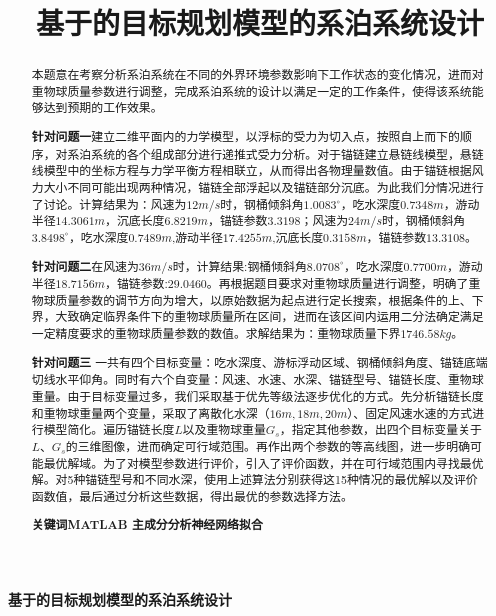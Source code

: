 \documentclass{cumcm}
\title{基于的目标规划模型的系泊系统设计}
\begin{document}
 

\begin{minipage}{0.9\textwidth}
\centering\LARGE\textbf{基于的目标规划模型的系泊系统设计}
\end{minipage}

\setcounter{page}{1}
\begin{abstract}
本题意在考察分析系泊系统在不同的外界环境参数影响下工作状态的变化情况，进而对重物球质量参数进行调整，完成系泊系统的设计以满足一定的工作条件，使得该系统能够达到预期的工作效果。\par
\textbf{针对问题一}\quad 建立二维平面内的力学模型，以浮标的受力为切入点，按照自上而下的顺序，对系泊系统的各个组成部分进行递推式受力分析。对于锚链建立悬链线模型，悬链线模型中的坐标方程与力学平衡方程相联立，从而得出各物理量数值。由于锚链根据风力大小不同可能出现两种情况，锚链全部浮起以及锚链部分沉底。为此我们分情况进行了讨论。计算结果为：风速为$12m/s$时，钢桶倾斜角$1.0083^\circ$，吃水深度$0.7348m$，游动半径$14.3061m$，沉底长度$6.8219m$，锚链参数$3.3198$；风速为$24m/s$时，钢桶倾斜角$3.8498^\circ$，吃水深度$0.7489m$,游动半径$17.4255m$,沉底长度$0.3158m$，锚链参数$13.3108$。\par
\textbf{针对问题二}\quad 在风速为$36m/s$时，计算结果:钢桶倾斜角$8.0708^\circ$，吃水深度$0.7700m$，游动半径$18.7156m$，锚链参数:$29.0460$。再根据题目要求对重物球质量进行调整，明确了重物球质量参数的调节方向为增大，以原始数据为起点进行定长搜索，根据条件的上、下界，大致确定临界条件下的重物球质量所在区间，进而在该区间内运用二分法确定满足一定精度要求的重物球质量参数的数值。求解结果为：重物球质量下界$1746.58kg$。\par
\textbf{针对问题三}\quad
一共有四个目标变量：吃水深度、游标浮动区域、钢桶倾斜角度、锚链底端切线水平仰角。同时有六个自变量：风速、水速、水深、锚链型号、锚链长度、重物球重量。由于目标变量过多，我们采取基于优先等级法逐步优化的方式。先分析锚链长度和重物球重量两个变量，采取了离散化水深（$16m,18m,20m$）、固定风速水速的方式进行模型简化。遍历锚链长度$L$以及重物球重量$G_s$，指定其他参数，出四个目标变量关于$L$、$G_s$的三维图像，进而确定可行域范围。再作出两个参数的等高线图，进一步明确可能最优解域。为了对模型参数进行评价，引入了评价函数，并在可行域范围内寻找最优解。对5种锚链型号和不同水深，使用上述算法分别获得这15种情况的最优解以及评价函数值，最后通过分析这些数据，得出最优的参数选择方法。\\ \par


\textbf{关键词\quad MATLAB \quad 主成分分析\quad 神经网络拟合}
\end{abstract}
\end{document}
